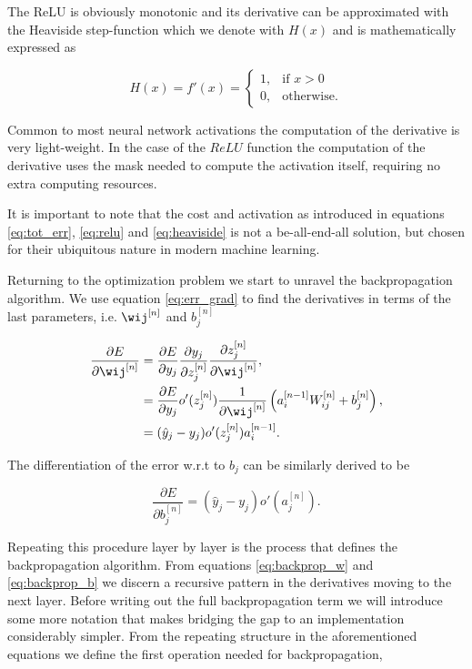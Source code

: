 \noindent The ReLU is obviously monotonic and its derivative can be approximated with the Heaviside step-function which we denote with $H(x)$ and is mathematically expressed as 

\begin{equation}\label{eq:heaviside}
H(x) = f'(x) = 	\begin{cases}1, & \text{if } x > 0 \\
	0,  & \text{otherwise}.
\end{cases}
\end{equation}

\noindent Common to most neural network activations the computation of the derivative is very light-weight. In the case of the $ReLU$ function the computation of the derivative uses the mask needed to compute the activation itself, requiring no extra computing resources. 

It is important to note that the cost and activation as introduced in equations \ref{eq:tot_err}, \ref{eq:relu} and \ref{eq:heaviside} is not a be-all-end-all solution, but chosen for their ubiquitous nature in modern machine learning.

Returning to the optimization problem we start to unravel the backpropagation algorithm. We use equation \ref{eq:err_grad} to find the derivatives in terms of the last parameters, i.e. $\wij^{[n]}$ and $b_j^{[n]}$

\begin{align}
\frac{\partial E}{\partial \wij^{[n]}} &= 
\frac{\partial E}{\partial y_j} 
\frac{\partial y_j}{\partial z_j^{[n]}}
\frac{\partial z_j^{[n]}}{\partial \wij^{[n]}}, \\
&= \frac{\partial E}{\partial y_j} o'(z^{[n]}_j)
\frac{1}{\partial \wij^{[n]}} \left(a^{[n-1]}_iW^{[n]}_{ij} + b^{[n]}_j\right), \\
&= (\hat{y}_j - y_j)o'(z^{[n]}_j) a^{[n-1]}_i. \label{eq:backprop_w}
\end{align}

\noindent The differentiation of the error w.r.t to $b_j$ can be similarly derived to be 

\begin{equation}\label{eq:backprop_b}
\frac{\partial E}{\partial b_j^{[n]}}= (\hat{y}_j - y_j)o'(a^{[n]}_j).
\end{equation}

\noindent Repeating this procedure layer by layer is the process that defines the backpropagation algorithm. From equations \ref{eq:backprop_w} and \ref{eq:backprop_b} we discern a recursive pattern in the derivatives moving to the next layer. Before writing out the full backpropagation term we will introduce some more notation that makes bridging the gap to an implementation considerably simpler. From the repeating structure in the aforementioned equations we define the first operation needed for backpropagation,


